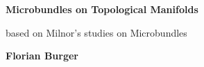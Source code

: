 \begin{titlepage}
    \begin{center}

        \vfill %

        \Huge
        \textbf{Microbundles on Topological Manifolds}

        \vspace{0.5cm} %

        \LARGE
        based on Milnor's studies on Microbundles

        \vspace{1.5cm} %

        \textbf{Florian Burger}
    \end{center}
\end{titlepage}